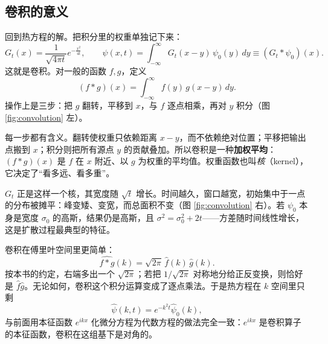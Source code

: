 \documentclass[UTF8]{ctexbook}
\begin{document}
\subsection{卷积的意义}

回到热方程的解。把积分里的权重单独记下来：
\[
G_t(x)=\frac{1}{\sqrt{4\pi t}}e^{-\frac{x^2}{4t}},
\qquad
\psi(x,t)=\int_{-\infty}^{\infty}G_t(x-y)\,\psi_0(y)\,dy\equiv(G_t*\psi_0)(x).
\]
这就是卷积。对一般的函数 $f,g$，定义
\[
(f*g)(x)=\int_{-\infty}^{\infty}f(y)\,g(x-y)\,dy.
\]
操作上是三步：把 $g$ 翻转，平移到 $x$，与 $f$ 逐点相乘，再对 $y$ 积分（图 \ref{fig:convolution} 左）。

每一步都有含义。翻转使权重只依赖距离 $x-y$，而不依赖绝对位置；平移把输出点搬到 $x$；积分则把所有源点 $y$ 的贡献叠加。所以卷积是一种\textbf{加权平均}：$(f*g)(x)$ 是 $f$ 在 $x$ 附近、以 $g$ 为权重的平均值。权重函数也叫\emph{核}（kernel），它决定了“看多远、看多重”。

$G_t$ 正是这样一个核，其宽度随 $\sqrt t$ 增长。时间越久，窗口越宽，初始集中于一点的分布被摊平：峰变矮、变宽，而总面积不变（图 \ref{fig:convolution} 右）。若 $\psi_0$ 本身是宽度 $\sigma_0$ 的高斯，结果仍是高斯，且 $\sigma^2=\sigma_0^2+2t$——方差随时间线性增长，这是扩散过程最典型的特征。

卷积在傅里叶空间里更简单：
\[
\widehat{f*g}(k)=\sqrt{2\pi}\,\hat f(k)\,\hat g(k).
\]
按本书的约定，右端多出一个 $\sqrt{2\pi}$；若把 $1/\sqrt{2\pi}$ 对称地分给正反变换，则恰好是 $\hat f\hat g$。无论如何，卷积这个积分运算变成了逐点乘法。于是热方程在 $k$ 空间里只剩
\[
\hat\psi(k,t)=e^{-k^2t}\hat\psi_0(k),
\]
与前面用本征函数 $e^{ikx}$ 化微分方程为代数方程的做法完全一致：$e^{ikx}$ 是卷积算子的本征函数，卷积在这组基下是对角的。
\end{document}
